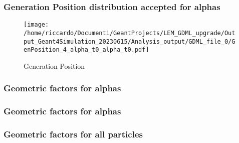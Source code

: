 \documentclass[8pt]{beamer}
\begin{document}
        \begin{frame}
            \frametitle{Generation Position distribution accepted for alphas}
        
        \begin{figure}[h]
            \centering
            \texttt{[image: /home/riccardo/Documenti/GeantProjects/LEM\_GDML\_upgrade/Output\_Geant4Simulation\_20230615/Analysis\_output/GDML\_file\_0/GenPosition\_4\_alpha\_t0\_alpha\_t0.pdf]}
            \caption{Generation Position}
        \end{figure}
        
        \end{frame}
        
        \begin{frame}
            \frametitle{Geometric factors for alphas}
        
        \end{frame}
        
        \begin{frame}
            \frametitle{Geometric factors for alphas}
        
        \end{frame}
        
        \begin{frame}
            \frametitle{Geometric factors for all particles}
        
        \end{frame}
        
        
\end{document}
